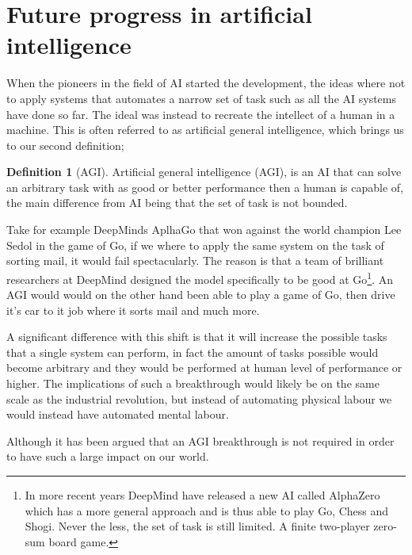 \documentclass{report}
\theoremstyle{definition}
\newtheorem{definition}{Definition}[section]
\begin{document}
\section{Future progress in artificial intelligence}
When the pioneers in the field of AI started the development, the ideas where not to apply systems that automates a narrow set of task such as all the AI systems have done so far. The ideal was instead to recreate the intellect of a human in a machine. This is often referred to as artificial general intelligence, which brings us to our second definition;
\begin{definition}[AGI]
Artificial general intelligence (AGI), is an AI that can solve an arbitrary task with as good or better performance then a human is capable of, the main difference from AI being that the set of task is not bounded.
  \label{AGI}
\end{definition}
Take for example DeepMinds AplhaGo that won against the world champion Lee Sedol in the game of Go, if we where to apply the same system on the task of sorting mail, it would fail spectacularly. The reason is that a team of brilliant researchers at DeepMind designed the model specifically to be good at Go\footnote{In more recent years DeepMind have released a new AI called AlphaZero which has a more general approach and is thus able to play Go, Chess and Shogi. Never the less, the set of task is still limited. A finite two-player zero-sum board game.}. An AGI would would on the other hand been able to play a game of Go, then drive it's car to it job where it sorts mail and much more. 

A significant difference with this shift is that it will increase the possible tasks that a single system can perform, in fact the amount of tasks possible would become arbitrary and they would be performed at human level of performance or higher. The implications of such a breakthrough would likely be on the same scale as the industrial revolution, but instead of automating physical labour we would instead have automated mental labour. 

Although it has been argued that an AGI breakthrough is not required in order to have such a large impact on our world. 
\end{document}

